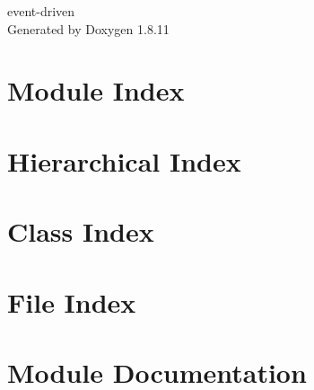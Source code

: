 \documentclass[twoside]{book}
\newcommand{\+}{\discretionary{\mbox{\scriptsize$\hookleftarrow$}}{}{}}
\newcommand{\clearemptydoublepage}{%
  \newpage{\pagestyle{empty}\cleardoublepage}%
}
\begin{document}
\hypersetup{pageanchor=false,
             bookmarksnumbered=true,
             pdfencoding=unicode
            }
\begin{titlepage}
\vspace*{7cm}
\begin{center}%
{\Large event-\/driven }\\
\vspace*{1cm}
{\large Generated by Doxygen 1.8.11}\\
\end{center}
\end{titlepage}
\clearemptydoublepage
\tableofcontents
\clearemptydoublepage
{}
\hypersetup{pageanchor=true}

\chapter{Module Index}

\chapter{Hierarchical Index}

\chapter{Class Index}

\chapter{File Index}

\chapter{Module Documentation}

























\end{document}
